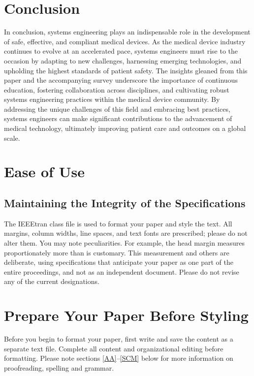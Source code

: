 \documentclass[conference]{IEEEtran}
\begin{document}
\section{Conclusion}

    In conclusion, systems engineering plays an indispensable role in 
    the development of safe, effective, and compliant medical devices. 
    As the medical device industry continues to evolve at an 
    accelerated pace, systems engineers must rise to the occasion by 
    adapting to new challenges, harnessing emerging technologies, and 
    upholding the highest standards of patient safety. The insights 
    gleaned from this paper and the accompanying survey underscore the 
    importance of continuous education, fostering collaboration across 
    disciplines, and cultivating robust systems engineering practices 
    within the medical device community. By addressing the unique 
    challenges of this field and embracing best practices, systems 
    engineers can make significant contributions to the advancement of 
    medical technology, ultimately improving patient care and outcomes 
    on a global scale.

\section{Ease of Use}

\subsection{Maintaining the Integrity of the Specifications}

The IEEEtran class file is used to format your paper and style the text. All margins, 
column widths, line spaces, and text fonts are prescribed; please do not 
alter them. You may note peculiarities. For example, the head margin
measures proportionately more than is customary. This measurement 
and others are deliberate, using specifications that anticipate your paper 
as one part of the entire proceedings, and not as an independent document. 
Please do not revise any of the current designations.

\section{Prepare Your Paper Before Styling}
Before you begin to format your paper, first write and save the content as a 
separate text file. Complete all content and organizational editing before 
formatting. Please note sections \ref{AA}--\ref{SCM} below for more information on 
proofreading, spelling and grammar.
\end{document}
